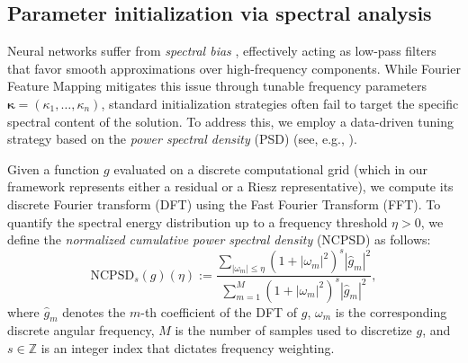 \documentclass{article}
\theoremstyle{definition}
\begin{document}
\subsection{Parameter initialization via spectral analysis} \label{subsec:NCPSD}

Neural networks suffer from \textit{spectral bias} \cite{Cao2021Spectral, Rahaman2019Spectral}, effectively acting as low-pass filters that favor smooth approximations over high-frequency components. While Fourier Feature Mapping mitigates this issue through tunable frequency parameters $\boldsymbol{\kappa}=(\kappa_1, \dots, \kappa_n)$, standard initialization strategies often fail to target the specific spectral content of the solution. To address this, we employ a data-driven tuning strategy based on the \textit{power spectral density} (PSD) (see, e.g., \cite{brunton2022datadriven, kim2024cumulative}).

{Given a function $g$ evaluated on a discrete computational grid (which in our framework represents either a residual or a Riesz representative)}, we compute its discrete Fourier transform (DFT) using the Fast Fourier Transform (FFT). To quantify the spectral energy distribution up to a frequency threshold $\eta>0$, we define the \textit{normalized cumulative power spectral density} (NCPSD) as follows:
\begin{equation} \label{eq: discrete_NCPSD}
    \text{NCPSD}_s(g)(\eta) := \frac{\displaystyle \sum_{|\omega_m| \le \eta} (1 + |\omega_m|^2)^s |\hat{g}_m|^2}{\displaystyle \sum_{m=1}^{M} (1 + |\omega_m|^2)^s |\hat{g}_m|^2},
\end{equation}
where $\hat{g}_m$ denotes the $m$-th coefficient of the DFT of $g$, $\omega_m$ is the corresponding discrete angular frequency, {$M$ is the number of samples used to discretize $g$}, and $s \in \mathbb{Z}$ is an integer index that dictates frequency weighting.
\end{document}
